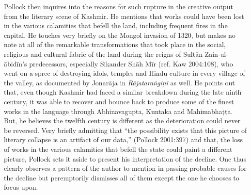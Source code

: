 Pollock then inquires into the reasons for such rupture in the creative output from the literary scene of Kashmir. He mentions that works could have been lost in the various calamities that befell the land, including frequent fires in the capital. He touches very briefly on the Mongol invasion of 1320, but makes no note at all of the remarkable transformations that took place in the social, religious and cultural fabric of the land during the reigns of Sultān Zain-ul-ābidīn’s predecessors, especially Sikander Shāh Mīr (ref. Kaw 2004:108), who went on a spree of destroying idols, temples and Hindu culture in every village of the valley, as documented by Jonarāja in {\sl Rājataraṅgiṇī} as well. He points out that, even though Kashmir had faced a similar breakdown during the late ninth century, it was able to recover and bounce back to produce some of the finest works in the language through Abhinavagupta, Kuntaka and Mahimabhaṭṭa. But, he believes the twelfth century is different as the deterioration could never be reversed. Very briefly admitting that “the possibility exists that this picture of literary collapse is an artifact of our data,” (Pollock 2001:397) and that, the loss of works in the various calamities that befell the state could paint a different picture, Pollock sets it aside to present his interpretation of the decline. One thus clearly observes a pattern of the author to mention in passing probable causes for the decline but peremptorily dismisses all of them except the one he chooses to focus upon.

